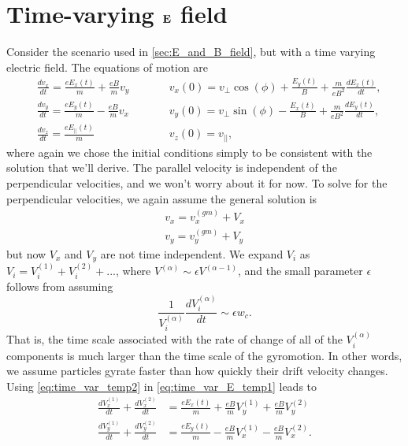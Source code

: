 \documentclass[oneside,a4paper,11pt]{report}
\begin{document}
\section{Time-varying $\mathbf{E}$ field}
Consider the scenario used in \cref{sec:E_and_B_field}, but with a time varying electric field. The equations of motion are
\begin{subequations}
\label{eq:time_var_E_temp1}
\begin{alignat}{2}
    &\frac{d v_x}{dt} = \frac{eE_x(t)}{m} + \frac{eB}{m} v_y  \qquad && v_x(0) = v_\perp \cos(\phi) + \frac{E_y(t)}{B} + \frac{m}{eB^2}\frac{dE_x(t)}{dt},  \\
    &\frac{d v_y}{dt} = \frac{eE_y(t)}{m} - \frac{eB}{m} v_x  \qquad && v_y(0) = v_\perp \sin(\phi) - \frac{E_x(t)}{B} + \frac{m}{eB^2}\frac{dE_y(t)}{dt},  \\
    &\frac{d v_z}{dt} = \frac{e E_{||}(t)}{m}  \qquad && v_z(0) = v_{||}, 
\end{alignat}
\end{subequations}
where again we chose the initial conditions simply to be consistent with the solution that we'll derive. The parallel velocity is independent of the perpendicular velocities, and we won't worry about it for now. To solve for the perpendicular velocities, we again assume the general solution is 
\begin{align}
\label{eq:time_var_temp2}
    v_x = v_x^{(gm)} + V_x \nonumber \\
    v_y = v_y^{(gm)} + V_y 
\end{align}
but now $V_x$ and $V_y$ are not time independent. We expand $V_i$ as $V_i = V^{(1)}_i +  V^{(2)}_i + ...$, where $V^{(\alpha)} \sim \epsilon V^{(\alpha-1)}$, and the small parameter $\epsilon$ follows from assuming 
\begin{equation}
\label{eq:time_var_E_temp3}
    \frac{1}{V^{(\alpha)}_i} \frac{d V^{(\alpha)}_i}{dt} \sim \epsilon w_c.
\end{equation}
That is, the time scale associated with the rate of change of all of the $V^{(\alpha)}_i$ components is much larger than the time scale of the gyromotion. In other words, we assume particles gyrate faster than how quickly their drift velocity changes. Using \cref{eq:time_var_temp2} in \cref{eq:time_var_E_temp1} leads to
\begin{align}
    \frac{dV_x^{(1)}}{dt} + \frac{dV_x^{(2)}}{dt} &= \frac{eE_x(t)}{m} + \frac{eB}{m} V_y^{(1)} + \frac{eB}{m} V_y^{(2)} \nonumber \\
    \frac{dV_y^{(1)}}{dt} + \frac{dV_y^{(2)}}{dt} &= \frac{eE_y(t)}{m} - \frac{eB}{m} V_x^{(1)} - \frac{eB}{m} V_x^{(2)}.
\end{align}
\end{document}
